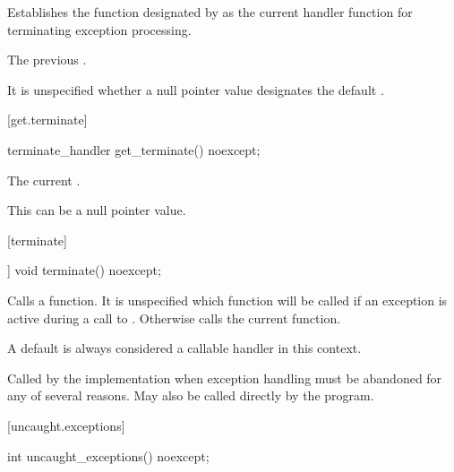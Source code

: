 \begin{itemdescr}
\pnum
\effects
Establishes the function designated by  as the current
handler function for terminating exception processing.

\pnum
\returns
The previous .

\pnum
\remarks
It is unspecified whether a null pointer value designates the default
.
\end{itemdescr}

[get.terminate]{}

%
\begin{itemdecl}
terminate_handler get_terminate() noexcept;
\end{itemdecl}

\begin{itemdescr}
\pnum
\returns
The current .
\begin{note}
This can be a null pointer value.
\end{note}
\end{itemdescr}

[terminate]{}

%
\begin{itemdecl}
[[noreturn]] void terminate() noexcept;
\end{itemdecl}

\begin{itemdescr}
\pnum
\effects
Calls a  function. It is unspecified which
 function will be called if an exception is active
during a call to .
Otherwise calls the current  function.
\begin{note}
A
default  is always considered a callable handler in
this context.
\end{note}

\pnum
\remarks
Called by the implementation when exception
handling must be abandoned for any of several reasons.
May also be called directly by the program.
\end{itemdescr}

[uncaught.exceptions]{}

%
\begin{itemdecl}
int uncaught_exceptions() noexcept;
\end{itemdecl}

